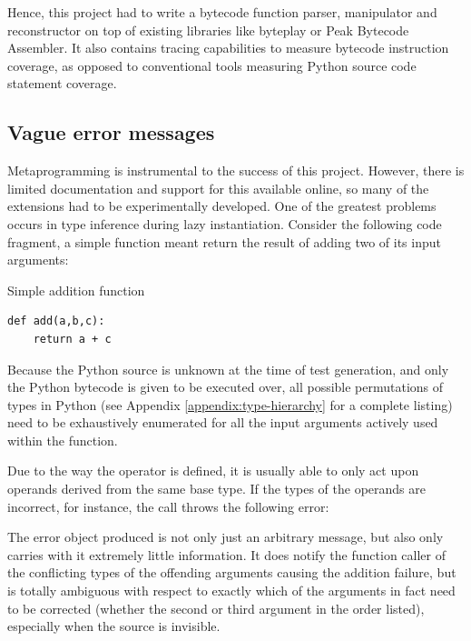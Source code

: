\documentclass{icldt}
\numberwithin{equation}{section}       %
\begin{document}
{{Hence, this project had to write a bytecode function parser, manipulator and reconstructor on top of existing libraries like \textsf{byteplay} or \textsf{Peak Bytecode Assembler}. It also contains tracing capabilities to measure bytecode instruction coverage, as opposed to conventional tools measuring Python source code statement coverage.

\subsection{Vague error messages}
Metaprogramming is instrumental to the success of this project. However, there is limited documentation and support for this available online, so many of the extensions had to be experimentally developed. One of the greatest problems occurs in type inference during lazy instantiation. Consider the following code fragment, a simple function meant return the result of adding two of its input arguments:

\begin{listing}[H]
	\caption{Simple addition function}
	\begin{verbatim}
def add(a,b,c):
	return a + c
	\end{verbatim}
	\label{lst:py-addition}
\end{listing}

Because the Python source is unknown at the time of test generation, and only the Python bytecode is given to be executed over, all possible permutations of types in Python (see Appendix \ref{appendix:type-hierarchy} for a complete listing) need to be exhaustively enumerated for all the input arguments actively used within the function.

Due to the way the \pyth{+} operator is defined, it is usually able to only act upon operands derived from the same base type. If the types of the operands are incorrect, for instance, the call  throws the following error:


The error object produced is not only just an arbitrary  message, but also only carries with it extremely little information. It does notify the function caller of the conflicting types of the offending arguments causing the addition failure, but is totally ambiguous with respect to exactly which of the arguments in fact need to be corrected (whether the second or third argument in the order listed), especially when the source is invisible.

}}
\end{document}

